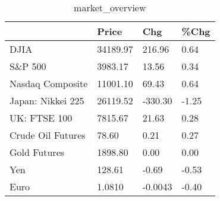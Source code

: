 \documentclass{article}%
\begin{document}
%


\begin{table}[htbp]%
\caption{market\_overview}%
\centering%
\begin{adjustbox}{width=1\textwidth}%
\begin{tabular}{llll}
\toprule
                  &    Price &     Chg &  \%Chg \\
\midrule
             DJIA & 34189.97 &  216.96 &  0.64 \\
          S\&P 500 &  3983.17 &   13.56 &  0.34 \\
 Nasdaq Composite & 11001.10 &   69.43 &  0.64 \\
Japan: Nikkei 225 & 26119.52 & -330.30 & -1.25 \\
     UK: FTSE 100 &  7815.67 &   21.63 &  0.28 \\
Crude Oil Futures &    78.60 &    0.21 &  0.27 \\
     Gold Futures &  1898.80 &    0.00 &  0.00 \\
              Yen &   128.61 &   -0.69 & -0.53 \\
             Euro &   1.0810 & -0.0043 & -0.40 \\
\bottomrule
\end{tabular}
%
\end{adjustbox}%
\end{table}

%
\end{document}

